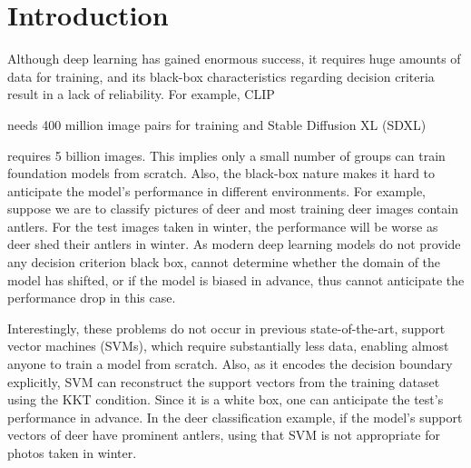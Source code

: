\section{Introduction}\label{sec:intro}

Although deep learning has gained enormous success, it requires huge amounts of data for training, and its black-box characteristics regarding decision criteria result in a lack of reliability. For example, CLIP {\cite{CLIP} needs 400 million image pairs for training and Stable Diffusion XL (SDXL) {\cite{SDXL} requires 5 billion images. This implies only a small number of groups can train foundation models from scratch. Also, the black-box nature makes it hard to anticipate the model’s performance in different environments. For example, suppose we are to classify pictures of deer and most training deer images contain antlers. For the test images taken in winter,  %
the performance will be worse as deer shed their antlers in winter. %
As modern deep learning models do not provide any decision criterion \ie black box,  cannot determine whether the domain of the model has shifted, or if the model is biased in advance, thus cannot anticipate the performance drop in this case.

Interestingly, these problems do not occur in previous state-of-the-art, support vector machines (SVMs), which require substantially less data, enabling almost anyone to train a model from scratch. Also, as it encodes the decision boundary explicitly, SVM can reconstruct the support vectors from the training dataset using the KKT condition. %
Since it %
is a white box, one can anticipate the test’s performance in advance.  In the deer classification example, if the model’s support vectors of deer have prominent antlers, using that SVM is not appropriate for photos taken in winter. 

}}
